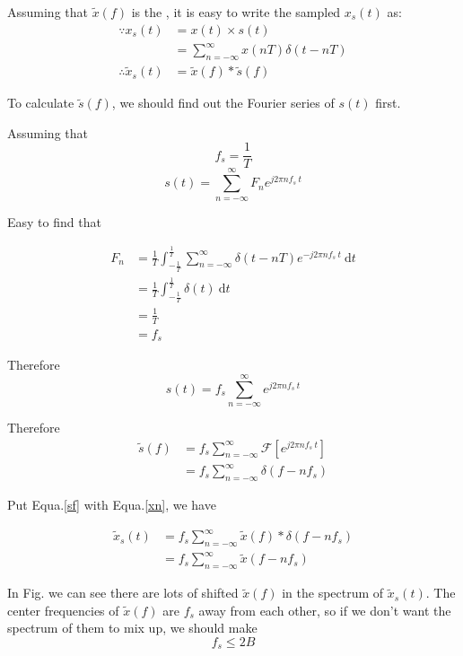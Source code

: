 \documentclass{article}
\begin{document}
Assuming that $\widetilde{x}(f)$ is the , it is easy to write the sampled $x_s(t)$ as:
\begin{align}
    \because x_s(t) &= x(t)\times s(t) \nonumber \\
    &= \sum_{n = -\infty}^{\infty} x(nT) \delta(t - nT) \label{xst} \\
    \therefore \widetilde{x}_s(t) &= \widetilde{x}(f) * \widetilde{s}(f) \label{xn}
\end{align}

To calculate $\widetilde{s}(f)$, we should find out the Fourier series of ${s}(t)$ first.

Assuming that 
$$
f_s = \frac{1}{T}
$$
$$
{s}(t) = \sum_{n = -\infty}^{\infty} F_n e^{j2\pi n f_s ~ t}
$$

Easy to find that

\begin{align*}
    F_n &= \frac{1}{T} \int_{- \frac{1}{T}}^{\frac{1}{T}} \sum_{n = -\infty}^{\infty} \delta(t - nT) e^{-j2\pi n f_s ~ t} ~\mathrm{d}t\\
    &= \frac{1}{T} \int_{- \frac{1}{T}}^{\frac{1}{T}} \delta(t) ~\mathrm{d}t \\
    &= \frac{1}{T} \\
    &= f_s
\end{align*}

Therefore
$$
    {s}(t) = f_s \sum_{n = -\infty}^{\infty}e^{j2\pi n f_s ~ t}
$$

Therefore
\begin{align}
    \widetilde{s}(f) &= f_s \sum_{n = -\infty}^{\infty} \mathcal{F} \left[ e^{j2\pi n f_s ~ t} \right]  \nonumber \\
    &= f_s \sum_{n = -\infty}^{\infty} \delta(f - nf_s)
    \label{sf}
\end{align}

Put Equa.\ref{sf} with Equa.\ref{xn}, we have

\begin{align}
    \widetilde{x}_s(t) &= f_s \sum_{n = -\infty}^{\infty} \widetilde{x}(f) * \delta(f - nf_s) \nonumber \\
    &= f_s \sum_{n = -\infty}^{\infty} \widetilde{x}(f - nf_s)
\end{align}

In Fig.  we can see there are lots of shifted $\widetilde{x}(f)$ in the spectrum of $\widetilde{x}_s(t)$. The center frequencies of $\widetilde{x}(f)$ are $f_s$ away from each other, so if we don't want the spectrum of them to mix up, we should make
$$
f_s \leq 2B
$$
\end{document}
